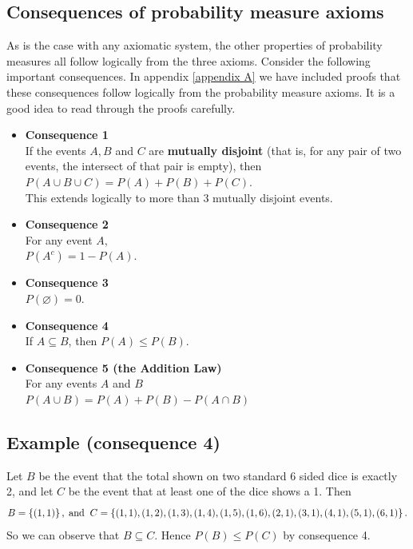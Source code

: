 \subsection{Consequences of probability measure axioms} \label{consequences}
As is the case with any axiomatic system, the other properties of probability measures all follow logically from the three axioms. Consider the following important consequences. In appendix \ref{appendix A} we have included proofs that these consequences follow logically from the probability measure axioms. It is a good idea to read through the proofs carefully.
\begin{itemize}
\item \textbf{Consequence 1} \label{consequence1} \\
If the events $A, B$ and $C$ are \textbf{mutually disjoint} \label{mutually disjoint} (that is, for any pair of two events, the intersect of that pair is empty), then \\
$P(A \cup B \cup C) = P(A) + P(B) + P(C)$. \\

This extends logically to more than 3 mutually disjoint events.
\item \textbf{Consequence 2} \\
For any event $A$, \\
$P(A^c) = 1 - P(A).$

\item \textbf{Consequence 3} \\
$P(\varnothing) = 0.$

\item \textbf{Consequence 4} \\
If $A \subseteq B$, then $P(A) \leq P(B)$.

\item \textbf{Consequence 5 (the Addition Law)} \label{addition law} \\ 
For any events $A$ and $B$ \\
$P(A \cup B) = P(A) + P(B) - P(A \cap B)$
\end{itemize}

\subsection{Example (consequence 4)}
Let $B$ be the event that the total shown on two standard 6 sided dice is exactly 2, and let $C$ be the event that at least one of the dice shows a 1. Then 
\[
B = \left\{(1,1)\right\}, \; \text{and}\;\; C = \left\{(1,1),(1,2),(1,3),(1,4),(1,5),(1,6),(2,1),(3,1),(4,1),(5,1),(6,1)\right\}.
\]
So we can observe that $B \subseteq C$. Hence $P(B) \leq P(C)$ by consequence 4. \\

